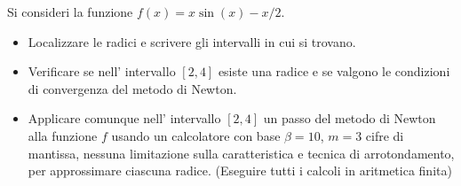 Si consideri la funzione $f(x)=x \sin(x)-x/2$.
\begin{itemize}
\item  Localizzare le radici e
scrivere gli intervalli in cui si trovano.
\item Verificare se nell' intervallo $[2,4]$ esiste una radice e se valgono le
condizioni di convergenza del metodo di Newton.
\item Applicare comunque nell' intervallo $[2,4]$ un passo del metodo di Newton alla funzione $f$
usando un calcolatore con base $\beta =10$, $m=3$ cifre di
mantissa, nessuna limitazione sulla caratteristica e tecnica di
arrotondamento, per approssimare ciascuna radice. (Eseguire tutti
i calcoli in aritmetica finita)
\end{itemize}
